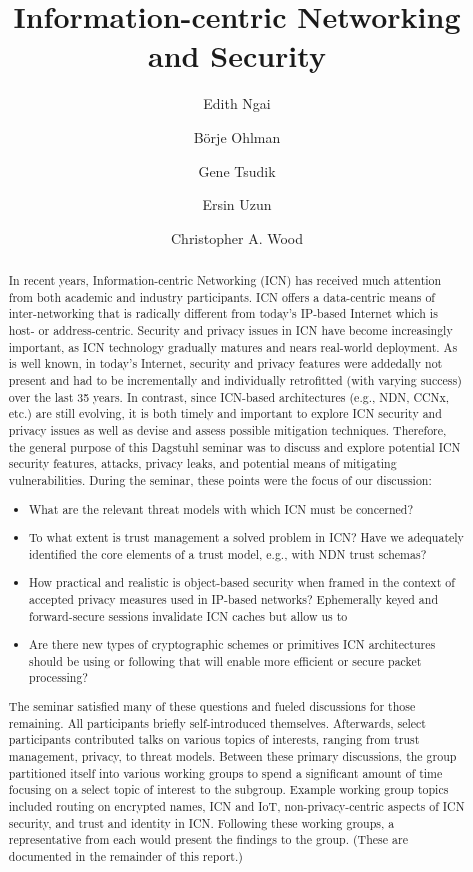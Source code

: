\documentclass[a4paper,UKenglish]{dagrep}
\title{Information-centric Networking and Security}
\author[1]{Edith Ngai}
\author[2]{Börje Ohlman}
\author[3]{Gene Tsudik}
\author[4]{Ersin Uzun}
\author[5]{Christopher A. Wood}
\affil[1]{Uppsala University, SE, \texttt{edith.ngai@it.uu.se}}
\affil[2]{Ericsson Research - Stockholm, SE, \texttt{borje.ohlman@ericsson.com}}
\affil[3]{University of California - Irvine, US, \texttt{gts@ics.uci.edu}}
\affil[4]{Xerox PARC - Palo Alto, US, \texttt{ersin.uzun@acm.org}}
\affil[5]{University of California - Irvine, US, \texttt{woodc1@uci.edu}}
\begin{document}
\maketitle

\begin{abstract}
In recent years, Information-centric Networking (ICN) has received much attention from both academic and industry participants. ICN offers a data-centric means of inter-networking that is radically different from today's IP-based Internet which is host- or address-centric. Security and privacy issues in ICN have become increasingly important, as ICN technology gradually matures and nears real-world deployment. As is well known, in today's Internet, security and privacy features were addedally not present and had to be incrementally and individually retrofitted (with varying success) over the last 35 years. In contrast, since ICN-based architectures (e.g., NDN, CCNx, etc.) are still evolving, it is both timely and important to explore ICN security and privacy issues as well as devise and assess possible mitigation techniques. Therefore, the general purpose of this Dagstuhl seminar was to discuss and explore potential ICN security features, attacks, privacy leaks, and potential means of mitigating vulnerabilities. During the seminar, these points were the focus of our discussion:

\begin{itemize}
\item What are the relevant threat models with which ICN must be concerned?
\item To what extent is trust management a solved problem in ICN? Have we adequately identified the core elements of a trust model, e.g., with NDN trust schemas?
\item How practical and realistic is object-based security when framed in the context of accepted privacy measures used in IP-based networks? Ephemerally keyed and forward-secure sessions invalidate ICN caches but allow us to
\item Are there new types of cryptographic schemes or primitives ICN architectures should be using or following that will enable more efficient or secure packet processing?
\end{itemize}

The seminar satisfied many of these questions and fueled discussions for those remaining. All participants briefly self-introduced themselves. Afterwards, select participants contributed talks on various topics of interests, ranging from trust management, privacy, to threat models. Between these primary discussions, the group partitioned itself into various working groups to spend a significant amount of time focusing on a select topic of interest to the subgroup. Example working group topics included routing on encrypted names, ICN and IoT, non-privacy-centric aspects of ICN security, and trust and identity in ICN. Following these working groups, a representative from each would present the findings to the group. (These are documented in the remainder of this report.)


\end{abstract}
\end{document}
